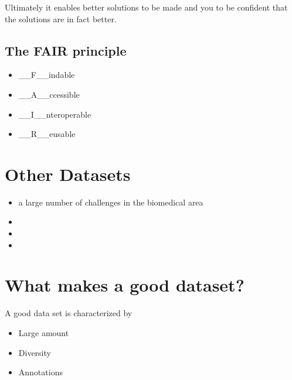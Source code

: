 \documentclass[letterpaper,10pt,english]{sphinxmanual}
\begin{document}
\sphinxAtStartPar
Ultimately it enables better solutions to be made and you to be confident that the solutions are in fact better.


\subsection{The FAIR principle}
\label{\detokenize{03-Datasets:the-fair-principle}}\begin{itemize}
\item {} 
\sphinxAtStartPar
\_\_F\_\_indable

\item {} 
\sphinxAtStartPar
\_\_A\_\_ccessible

\item {} 
\sphinxAtStartPar
\_\_I\_\_nteroperable

\item {} 
\sphinxAtStartPar
\_\_R\_\_eusable

\end{itemize}

\sphinxAtStartPar
{}


\section{Other Datasets}
\label{\detokenize{03-Datasets:other-datasets}}\begin{itemize}
\item {} 
\sphinxAtStartPar
{} a large number of challenges in the biomedical area

\item {} 
\sphinxAtStartPar
{}

\item {} 
\sphinxAtStartPar
{}

\item {} 
\sphinxAtStartPar
{}

\end{itemize}


\section{What makes a good dataset?}
\label{\detokenize{03-Datasets:what-makes-a-good-dataset}}
\sphinxAtStartPar
A good data set is characterized by
\begin{itemize}
\item {} 
\sphinxAtStartPar
Large amount

\item {} 
\sphinxAtStartPar
Diversity

\item {} 
\sphinxAtStartPar
Annotations

\end{itemize}
\end{document}
